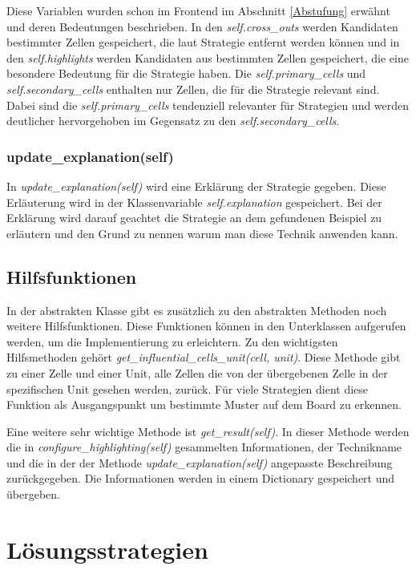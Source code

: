 Diese Variablen wurden schon im Frontend im Abschnitt \ref{Abstufung} erwähnt und deren Bedeutungen beschrieben. In den \textit{self.cross\_outs} werden Kandidaten bestimmter Zellen gespeichert, die laut Strategie entfernt werden können und in den \textit{self.highlights} werden Kandidaten aus bestimmten Zellen gespeichert, die eine besondere Bedeutung für die Strategie haben. Die \textit{self.primary\_cells} und \textit{self.secondary\_cells} enthalten nur Zellen, die für die Strategie relevant sind. Dabei sind die \textit{self.primary\_cells} tendenziell relevanter für Strategien und werden deutlicher hervorgehoben im Gegensatz zu den \textit{self.secondary\_cells}.

\subsubsection{update\_explanation(self)}
In \textit{update\_explanation(self)} wird eine Erklärung der Strategie gegeben. Diese Erläuterung wird in der Klassenvariable \textit{self.explanation} gespeichert. Bei der Erklärung wird darauf geachtet die Strategie an dem gefundenen Beispiel zu erläutern und den Grund zu nennen warum man diese Technik anwenden kann.

\subsection{Hilfsfunktionen}

In der abstrakten Klasse gibt es zusätzlich zu den abstrakten Methoden noch weitere Hilfsfunktionen. Diese Funktionen können in den Unterklassen aufgerufen werden, um die Implementierung zu erleichtern. Zu den wichtigsten Hilfsmethoden gehört \textit{get\_influential\_cells\_unit(cell, unit)}. Diese Methode gibt zu einer Zelle und einer Unit, alle Zellen die von der übergebenen Zelle in der spezifischen Unit gesehen werden, zurück. Für viele Strategien dient diese Funktion als Ausgangspunkt um bestimmte Muster auf dem Board zu erkennen.

Eine weitere sehr wichtige Methode ist \textit{get\_result(self)}. In dieser Methode werden die in \textit{configure\_highlighting(self)} gesammelten Informationen, der Technikname und die in der der Methode \textit{update\_explanation(self)} angepasste Beschreibung zurückgegeben. Die Informationen werden in einem Dictionary gespeichert und übergeben. 

\section{Lösungsstrategien}

